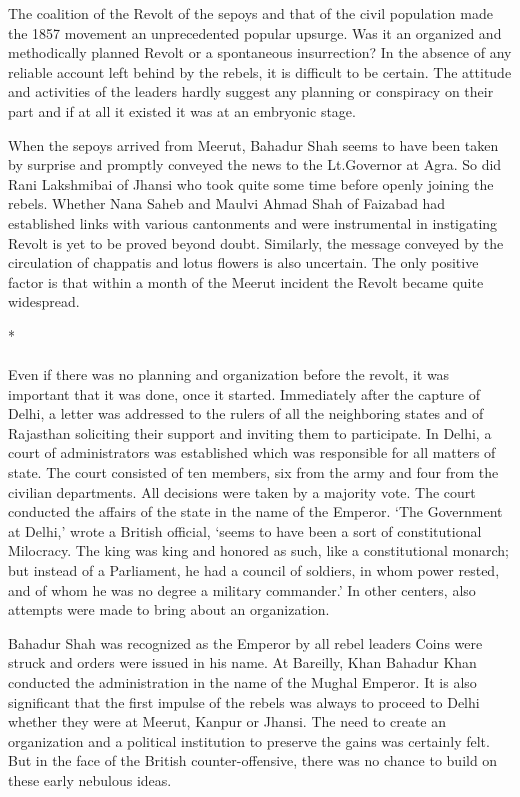 \begin{multicols}{2}
The coalition of the Revolt of the sepoys and that of the civil population made the 1857 movement an unprecedented popular upsurge. Was it an organized and methodically planned Revolt or a spontaneous insurrection? In the absence of any reliable account left behind by the rebels, it is difficult to be certain. The attitude and activities of the leaders hardly suggest any planning or conspiracy on their part and if at all it existed it was at an embryonic stage.

When the sepoys arrived from Meerut, Bahadur Shah seems to have been taken by surprise and promptly conveyed the news to the Lt.Governor at Agra. So did Rani Lakshmibai of Jhansi who took quite some time before openly joining the rebels. Whether Nana Saheb and Maulvi Ahmad Shah of Faizabad had established links with various cantonments and were instrumental in instigating Revolt is yet to be proved beyond doubt. Similarly, the message conveyed by the circulation of chappatis and lotus flowers is also uncertain. The only positive factor is that within a month of the Meerut incident the Revolt became quite widespread.

\begin{center}*\end{center}

\paragraph*{}
Even if there was no planning and organization before the revolt, it was important that it was done, once it started. Immediately after the capture of Delhi, a letter was addressed to the rulers of all the neighboring states and of Rajasthan soliciting their support and inviting them to participate. In Delhi, a court of administrators was established which was responsible for all matters of state. The court consisted of ten members, six from the army and four from the civilian departments. All decisions were taken by a majority vote. The court conducted the affairs of the state in the name of the Emperor. `The Government at Delhi,' wrote a British official, `seems to have been a sort of constitutional Milocracy. The king was king and honored as such, like a constitutional monarch; but instead of a Parliament, he had a council of soldiers, in whom power rested, and of whom he was no degree a military commander.' In other centers, also attempts were made to bring about an organization.

Bahadur Shah was recognized as the Emperor by all rebel leaders Coins were struck and orders were issued in his name. At Bareilly, Khan Bahadur Khan conducted the administration in the name of the Mughal Emperor. It is also significant that the first impulse of the rebels was always to proceed to Delhi whether they were at Meerut, Kanpur or Jhansi. The need to create an organization and a political institution to preserve the gains was certainly felt. But in the face of the British counter-offensive, there was no chance to build on these early nebulous ideas.


\end{multicols}
